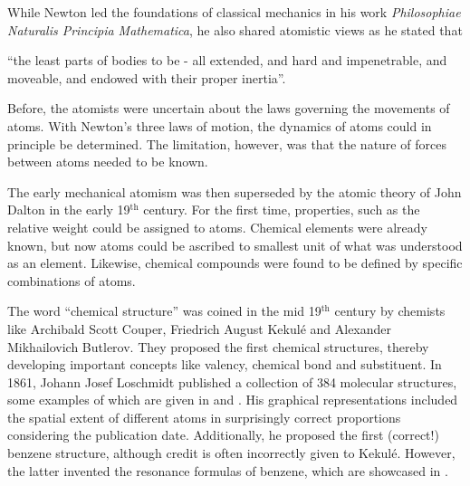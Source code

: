 While Newton led the foundations of classical mechanics in his work \textit{Philosophiae Naturalis Principia Mathematica},\cite{NE99.1} he 
also shared atomistic views as he stated that\cite{CA62.1}
%
\begin{displayquote}
``the least parts of bodies to be - all extended, and hard and impenetrable, and moveable, and endowed with their proper inertia''.%
\end{displayquote}
%
Before, the atomists were uncertain about the laws governing the
movements of atoms. With Newton's three laws of motion, the dynamics
of atoms could in principle be determined. The limitation, however, 
was that the nature of 
forces between atoms needed to be known.\cite{CH14.20}%

The early mechanical atomism was then superseded by the atomic theory
of John Dalton in the early 19$^{\mathrm{th}}$ century.\cite{CH14.20} For the first
time, properties, such as the relative weight  could be assigned to
atoms. Chemical elements were already known, but now
atoms could be ascribed to 
smallest unit of what was understood as an element. Likewise, chemical 
compounds were found to be defined by specific combinations of atoms.

The word ``chemical structure'' was 
coined in the mid 19$^{\mathrm{th}}$ century by
chemists like Archibald Scott Couper, Friedrich August Kekul\'e and
Alexander Mikhailovich Butlerov. They 
proposed the first
chemical structures, thereby developing important 
concepts like valency, chemical bond and substituent.\cite{SC98.6}
In 1861, Johann Josef Loschmidt published a collection of 384 molecular structures,
some examples of which are given in  and . His graphical
representations
 included the spatial extent of different atoms in surprisingly correct proportions
considering the publication date.
Additionally, he proposed the first (correct!) benzene structure, although
credit is often incorrectly given to Kekul\'e. However, the latter invented the
resonance formulas of benzene, which are showcased in .\cite{KE57.1,KE66.1,KE72.1,RO85.3}

